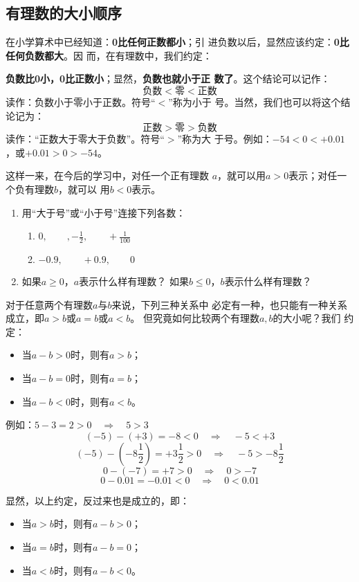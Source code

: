 \subsection{有理数的大小顺序}
在小学算术中已经知道：\textbf{0比任何正数都小}；引
进负数以后，显然应该约定：\textbf{0比任何负数都大}。因
而，在有理数中，我们约定：

\textbf{负数比0小，0比正数小}；显然，\textbf{负数也就小于正
	数了}。这个结论可以记作：
\[\text{负数}<\text{零}<\text{正数}\]
读作：负数小于零小于正数。符号“$<$”称为小于
号。当然，我们也可以将这个结论记为：
\[\text{正数}>\text{零}>\text{负数}\]
读作：“正数大于零大于负数”。符号“$>$”称为大
于号。例如：$-54<0<+0.01$，或$+0.01>0> -54$。

这样一来，在今后的学习中，对任一个正有理数
$a$，就可以用$a>0$表示；对任一个负有理数$b$，就可以
用$b<0$表示。

\begin{ex}
	\begin{enumerate}
		\item 用“大于号”或“小于号”连接下列各数：
		\begin{enumerate}
			\item $0,\qquad ,-\frac{1}{2},\qquad +\frac{1}{100}$
			\item $-0.9,\qquad +0.9,\qquad 0$
		\end{enumerate}
		\item 如果$a\ge 0$，$a$表示什么样有理数？
		如果$b\le 0$，$b$表示什么样有理数？
	\end{enumerate}
\end{ex}   

对于任意两个有理数$a$与$b$来说，下列三种关系中
必定有一种，也只能有一种关系成立，即$a>b$或$a =b$或$a<b$。
但究竟如何比较两个有理数$a,  b$的大小呢？我们
约定：
\begin{itemize}
	\item 当$a-b>0$时，则有$a > b$；
	\item     当$a-b=0$时，则有$a=b$；
	\item   当$a-b<0$时，则有$a < b$。
\end{itemize}

例如：$5-3=2>0 \quad \Rightarrow\quad 5>3$
\[(-5)-(+3)=-8<0 \quad \Rightarrow\quad -5<+3\]
\[(-5)-\left(-8\frac{1}{2}\right)=+3\frac{1}{2}>0 \quad \Rightarrow\quad -5>-8\frac{1}{2}\]
\[0-(-7)=+7>0 \quad \Rightarrow\quad 0>-7\]
\[0-0.01=-0.01<0 \quad \Rightarrow\quad 0<0.01\]

显然，以上约定，反过来也是成立的，即：
\begin{itemize}
	\item 当$a>b$时，则有$a-b>0$；
	\item     当$a =b$时，则有$a-b=0$；
	\item     当$a<b$时，则有$a-b<0$。
\end{itemize}

